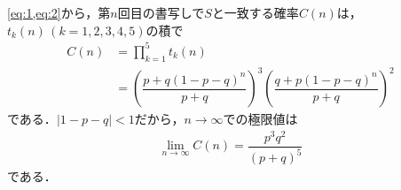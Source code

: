 \documentclass[../../main.tex]{subfiles}
\begin{document}
\cref{eq:1,eq:2}から，第$n$回目の書写しで$S$と一致する確率$C(n)$は，
$t_k(n)\, (k=1,2,3,4,5)$の積で
\begin{align}
  C(n)
  &= \prod_{k=1}^5 t_k(n) \\
  &= \left(\dfrac{p + q(1-p-q)^n}{p+q} \right)^3\left(\dfrac{q + p(1-p-q)^n}{p+q}\right)^2
\end{align}
である．$|1-p-q|<1$だから，$n\to\infty$での極限値は
\begin{align}
  \lim_{n\to\infty} C(n) =  \dfrac{p^3 q^2}{(p+q)^5}
\end{align}
である．

\newpage
\end{document}
